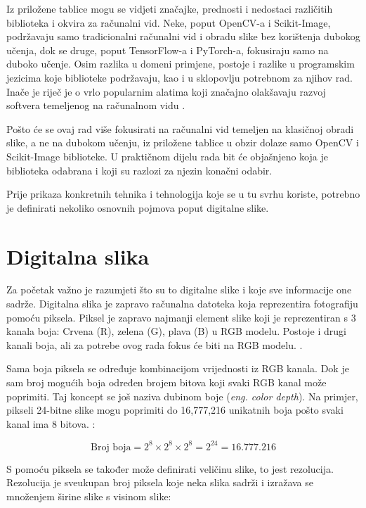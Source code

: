 \documentclass{foi}
\begin{document}
Iz priložene tablice mogu se vidjeti značajke, prednosti i nedostaci različitih biblioteka i okvira za računalni vid. Neke, poput OpenCV-a i Scikit-Image, podržavaju samo tradicionalni računalni vid i obradu slike bez korištenja dubokog učenja, dok se druge, poput TensorFlow-a i PyTorch-a, fokusiraju samo na duboko učenje. Osim razlika u domeni primjene, postoje i razlike u programskim jezicima koje biblioteke podržavaju, kao i u sklopovlju potrebnom za njihov rad. Inače je riječ je o vrlo popularnim alatima koji značajno olakšavaju razvoj softvera temeljenog na računalnom vidu \cite{Saiwa2024Nov}.

Pošto će se ovaj rad više fokusirati na računalni vid temeljen na klasičnoj obradi slike, a ne na dubokom učenju, iz priložene tablice u obzir dolaze samo OpenCV i Scikit-Image biblioteke. U praktičnom dijelu rada bit će objašnjeno koja je biblioteka odabrana i koji su razlozi za njezin konačni odabir.

Prije prikaza konkretnih tehnika i tehnologija koje se u tu svrhu koriste, potrebno je definirati nekoliko osnovnih pojmova poput digitalne slike.

\section{Digitalna slika}

Za početak važno je razumjeti što su to digitalne slike i koje sve informacije one sadrže. Digitalna slika je zapravo računalna datoteka koja reprezentira fotografiju pomoću piksela. Piksel je zapravo najmanji element slike koji je reprezentiran s 3 kanala boja: Crvena (R), zelena (G), plava (B) u RGB modelu. Postoje i drugi kanali boja, ali za potrebe ovog rada fokus će biti na RGB modelu. \cite{DigitalnaSlika}.

Sama boja piksela se određuje kombinacijom vrijednosti iz RGB kanala. Dok je sam broj mogućih boja određen brojem bitova koji svaki RGB kanal može poprimiti. Taj koncept se još naziva dubinom boje (\textit{eng. color depth}). Na primjer, pikseli 24-bitne slike mogu poprimiti do 16,777,216 unikatnih boja pošto svaki kanal ima 8 bitova. \cite{DigitalnaSlika}:

\[
\text{Broj boja} = 2^{8} \times 2^{8} \times 2^{8} = 2^{24} = 16.777.216
\]

S pomoću piksela se također može definirati veličinu slike, to jest rezolucija. Rezolucija je sveukupan broj piksela koje neka slika sadrži i izražava se množenjem širine slike s visinom slike:
\end{document}
